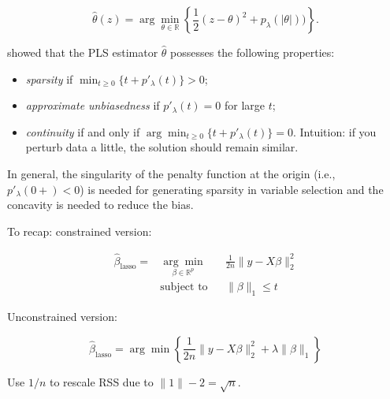 \[
\hat{\theta}(z) = \arg \min_{\theta \in \mathbb{R}} \left\{ \frac{1}{2}(z - \theta)^2 + p_\lambda(|\theta|)) \right\}.
\]

\citet{Antoniadis2001} showed that the PLS estimator \(\hat{\theta}\) possesses the following properties:

\begin{itemize}

\item \textit{sparsity} if \(\min_{t \geq 0} \{t + p'_\lambda (t) \} > 0\);

\item \textit{approximate unbiasedness} if \(p'_\lambda(t) = 0\) for large \(t\);

\item \textit{continuity} if and only if \(\arg \min_{t \geq 0} \{t + p'_\lambda(t) \} = 0\). Intuition: if you perturb data a little, the solution should remain similar. 

\end{itemize}

In general, the singularity of the penalty function at the origin (i.e., \(p'_\lambda(0+) < 0\)) is needed for generating sparsity in variable selection and the concavity is needed to reduce the bias. 

To recap: constrained version:


\[
\begin{aligned}
\hat{\beta}_{\text{lasso}} =  & {\underset {\beta \in \mathbb{R}^p}{\arg \min}}
& &\frac{1}{2n} \lVert y - X \beta \rVert_2^2  \\
& \text{subject to}
& & \lVert \beta \rVert_1 \leq t 
\end{aligned}
\]

Unconstrained version:

\[
\hat{\beta}_{\text{lasso}} = \arg \min \left\{ \frac{1}{2n} \lVert y - X \beta \rVert_2^2 + \lambda \lVert \beta \rVert_1 \right\}
\]

Use \(1/n\) to rescale RSS due to \(\lVert 1 \rVert-2 = \sqrt{n}\).


